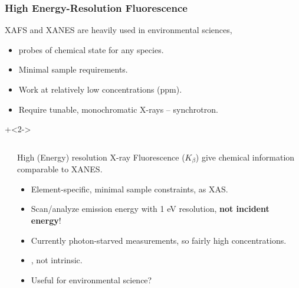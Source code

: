 \begin{frame}\frametitle{High Energy-Resolution Fluorescence}

XAFS and XANES are heavily used in environmental sciences,

\begin{itemize}
\item {} probes of chemical state for any species.
\item Minimal sample requirements.
\item Work at relatively low concentrations (ppm).
\item Require tunable, monochromatic X-rays -- synchrotron.
\end{itemize}

\onslide+<2->

\begin{columns}[T]
  \begin{column}{48mm}
    {}
  \end{column}
  \begin{column}{65mm}

    High (Energy) resolution X-ray Fluorescence ($K_\beta$)
    give chemical information comparable to XANES.

\begin{itemize}
\item Element-specific, minimal sample constraints, as XAS.
\item Scan/analyze emission energy with 1 eV resolution, {\bf{not incident energy}}!
\item Currently photon-starved measurements, so fairly high concentrations.
\item {}, not intrinsic.
\item Useful for environmental science?
\end{itemize}



  \end{column}
\end{columns}
\end{frame}
